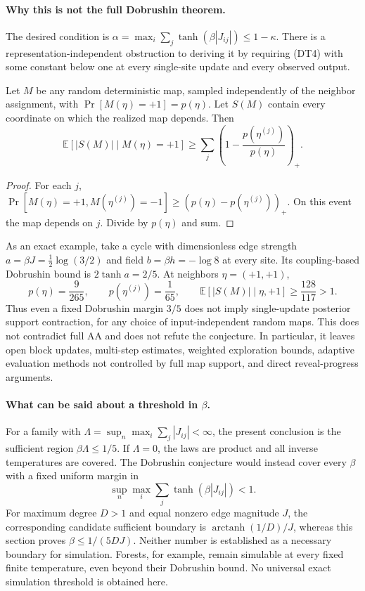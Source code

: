 \paragraph{Why this is not the full Dobrushin theorem.}
The desired condition is
$\alpha=\max_i\sum_j\tanh(\beta|J_{ij}|)\le1-\kappa$.
There is a representation-independent obstruction to deriving it
by requiring (DT4) with some constant below one at every single-site
update and every observed output.

\begin{proposition}
\label{prop:dobrushin-posterior-obstruction}
Let $M$ be any random deterministic map, sampled independently of
the neighbor assignment, with $\Pr[M(\eta)=+1]=p(\eta)$.
Let $S(M)$ contain every coordinate on which the realized map depends.
Then
\[
 \mathbb E[|S(M)|\mid M(\eta)=+1]
 \ge\sum_j\left(1-\frac{p(\eta^{(j)})}{p(\eta)}\right)_+.
                                                               \tag{DT8}
\]
\end{proposition}
\begin{proof}
For each $j$,
$\Pr[M(\eta)=+1,M(\eta^{(j)})=-1]
\ge(p(\eta)-p(\eta^{(j)}))_+$.
On this event the map depends on $j$. Divide by $p(\eta)$ and sum.
\end{proof}

As an exact example, take a cycle with dimensionless edge strength
$a=\beta J=\tfrac12\log(3/2)$ and field
$b=\beta h=-\log8$ at every site. Its coupling-based Dobrushin
bound is $2\tanh a=2/5$. At neighbors $\eta=(+1,+1)$,
\[
 p(\eta)=\frac9{265},\qquad
 p(\eta^{(j)})=\frac1{65},\qquad
 \mathbb E[|S(M)|\mid\eta,+1]\ge\frac{128}{117}>1.   \tag{DT9}
\]
Thus even a fixed Dobrushin margin $3/5$ does not imply
single-update posterior support contraction, for any choice of
input-independent random maps. This does not contradict full AA
and does not refute the conjecture. In particular, it leaves open
block updates, multi-step estimates, weighted exploration bounds,
adaptive evaluation methods not controlled by full map support,
and direct reveal-progress arguments.

\paragraph{What can be said about a threshold in $\beta$.}
For a family with $\Lambda=\sup_n\max_i\sum_j|J_{ij}|<\infty$,
the present conclusion is the sufficient region
$\beta\Lambda\le1/5$. If $\Lambda=0$, the laws are product and
all inverse temperatures are covered. The Dobrushin conjecture would
instead cover every $\beta$ with a fixed uniform margin in
\[
 \sup_n\max_i\sum_j\tanh(\beta|J_{ij}|)<1.
\]
For maximum degree $D>1$ and equal nonzero edge magnitude $J$,
the corresponding candidate sufficient boundary is
$\operatorname{arctanh}(1/D)/J$, whereas this section proves
$\beta\le1/(5DJ)$. Neither number is established as a necessary
boundary for simulation. Forests, for example, remain simulable at
every fixed finite temperature, even beyond their Dobrushin bound.
No universal exact simulation threshold is obtained here.

